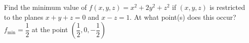 {Find the minimum value of $f(x,y,z) = x^2 + 2y^2 + z^2$ if $(x,y,z)$ is restricted to the planes $x+y+z=0$ and $x-z=1$. At what point(s) does this occur?
}
{$f_{\text{min}}= \dfrac{1}{2}$ at the point $\left( \dfrac{1}{2}, 0 , -\dfrac{1}{2}\right)$}